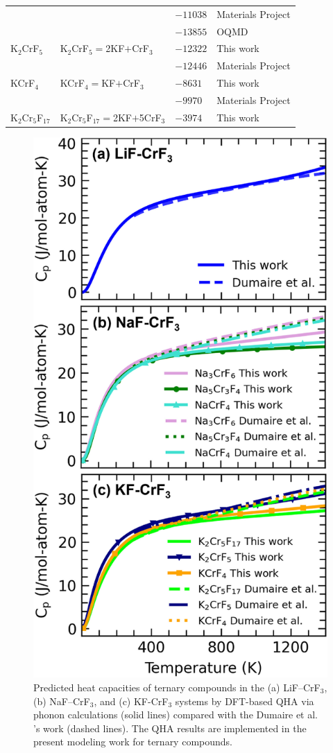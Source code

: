 \begin{table}[H]
\begin{tabular}{>{\raggedright\arraybackslash}m{2.5cm}>{\raggedright\arraybackslash}m{5cm}>{\raggedright\arraybackslash}m{3cm}>{\raggedright\arraybackslash}m{5cm}}
    &&$-11038$&Materials Project \cite{jain2013commentary}\\
	&&$-13855$&OQMD \cite{kirklin2015open}\\
    K$_2$CrF$_5$&K$_2$CrF$_5$$=$2KF$+$CrF$_3$&$-12322$&This work\\
	&&$-12446$&Materials Project \cite{jain2013commentary}\\
    KCrF$_4$&KCrF$_4$$=$KF$+$CrF$_3$&$-8631$&This work\\
    &&$-9970$&Materials Project \cite{jain2013commentary}\\
    K$_2$Cr$_5$F$_{17}$&K$_2$Cr$_5$F$_{17}$$=$2KF$+$5CrF$_3$&$-3974$&This work\\
    \hline
    \end{tabular}
    \label{ms:tab:FLiNaK-Cr-Hf}
\end{table}

\begin{figure}[H]
    \centering
    \includegraphics[width=0.45\linewidth]{moltensalts/Moltensalts-FLiNaKCr-DFTcompounds.jpg}
    \caption{Predicted heat capacities of ternary compounds in the (a) LiF–CrF$_3$, (b) NaF–CrF$_3$, and (c) KF-CrF$_3$ systems by DFT-based QHA via phonon calculations (solid lines) compared with the Dumaire et al. \cite{dumaire2021thermodynamic}'s work (dashed lines). The QHA results are implemented in the present modeling work for ternary compounds.}
    \label{ms:fig:FLiNaKCr-DFTcompounds}
\end{figure}

